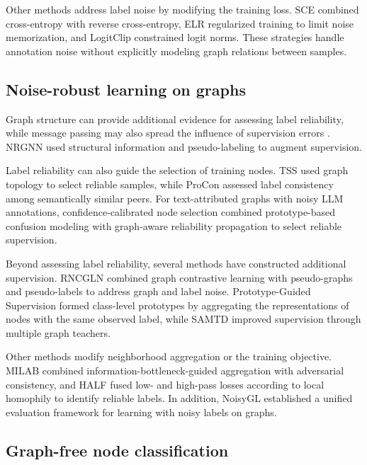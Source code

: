 \documentclass[times,review,10pt]{elsarticle}
\theoremstyle{definition}
\theoremstyle{plain}
\begin{document}
Other methods address label noise by modifying the training loss. SCE \cite{ref23} combined cross-entropy with reverse cross-entropy, ELR \cite{ref24} regularized training to limit noise memorization, and LogitClip \cite{ref26} constrained logit norms. These strategies handle annotation noise without explicitly modeling graph relations between samples.

\subsection{Noise-robust learning on graphs}\label{sec:2.2}

Graph structure can provide additional evidence for assessing label reliability, while message passing may also spread the influence of supervision errors \cite{ref6}. NRGNN \cite{ref7} used structural information and pseudo-labeling to augment supervision.

Label reliability can also guide the selection of training nodes. TSS \cite{ref9} used graph topology to select reliable samples, while ProCon \cite{ref29} assessed label consistency among semantically similar peers. For text-attributed graphs with noisy LLM annotations, confidence-calibrated node selection \cite{pr2026llm} combined prototype-based confusion modeling with graph-aware reliability propagation to select reliable supervision.

Beyond assessing label reliability, several methods have constructed additional supervision. RNCGLN \cite{ref33} combined graph contrastive learning with pseudo-graphs and pseudo-labels to address graph and label noise. Prototype-Guided Supervision \cite{ref34} formed class-level prototypes by aggregating the representations of nodes with the same observed label, while SAMTD \cite{ref36} improved supervision through multiple graph teachers.

Other methods modify neighborhood aggregation or the training objective. MILAB \cite{ref38} combined information-bottleneck-guided aggregation with adversarial consistency, and HALF \cite{ref39} fused low- and high-pass losses according to local homophily to identify reliable labels. In addition, NoisyGL \cite{ref6} established a unified evaluation framework for learning with noisy labels on graphs.

\subsection{Graph-free node classification}\label{sec:2.3}
\end{document}
